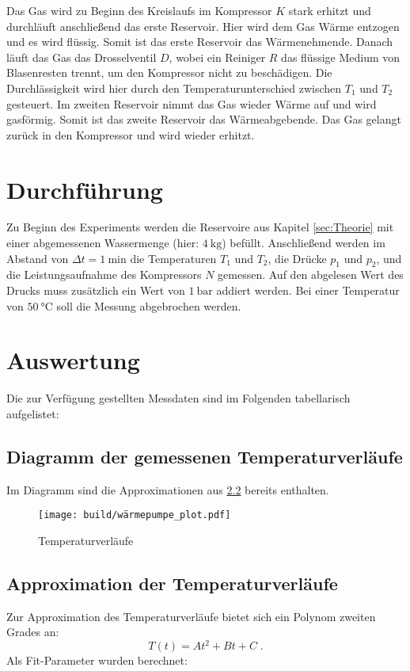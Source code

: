     Das Gas wird zu Beginn des Kreislaufs im Kompressor $K$ stark erhitzt und durchläuft anschließend das erste Reservoir.
    Hier wird dem Gas Wärme entzogen und es wird flüssig. Somit ist das erste Reservoir das Wärmenehmende.
    Danach läuft das Gas das Drosselventil $D$, wobei ein Reiniger $R$ das flüssige Medium von Blasenresten trennt, um den Kompressor nicht zu beschädigen.
    Die Durchlässigkeit wird hier durch den Temperaturunterschied zwischen $T_1$ und $T_2$ gesteuert.
    Im zweiten Reservoir nimmt das Gas wieder Wärme auf und wird gasförmig. Somit ist das zweite Reservoir das Wärmeabgebende.
    Das Gas gelangt zurück in den Kompressor und wird wieder erhitzt.

\section{Durchführung} \label{sec:Durchführung}
    Zu Beginn des Experiments werden die Reservoire aus Kapitel \ref{sec:Theorie} mit einer abgemessenen Wassermenge (hier: $\SI{4}{\kilogram}$) befüllt.
    Anschließend werden im Abstand von $\Delta t = \SI{1}{\minute}$ die Temperaturen $T_1$ und $T_2$, die Drücke $p_1$ und $p_2$, und die Leistungsaufnahme des Kompressors $N$ gemessen.
    Auf den abgelesen Wert des Drucks muss zusätzlich ein Wert von $\SI{1}{\bar}$ addiert werden.
    Bei einer Temperatur von $\SI{50}{\celsius}$ soll die Messung abgebrochen werden.

\section{Auswertung} \label{sec:Auswertung}
Die zur Verfügung gestellten Messdaten sind im Folgenden tabellarisch aufgelistet:


\newpage
\subsection{Diagramm der gemessenen Temperaturverläufe} %
Im Diagramm sind die Approximationen aus \ref{sec:approx} bereits enthalten.

\begin{figure}
  \centering
  \texttt{[image: build/wärmepumpe\_plot.pdf]}
  \caption{Temperaturverläufe}
  \label{fig:plot}
\end{figure}

\subsection{Approximation der Temperaturverläufe} \label{sec:approx} %
Zur Approximation des Temperaturverläufe bietet sich ein Polynom zweiten Grades an:
\[
T(t) = At^2 + Bt + C \; .
\]
Als Fit-Parameter wurden berechnet:

